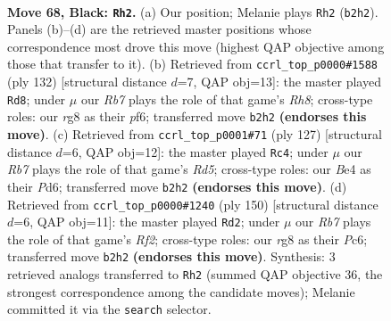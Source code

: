 \documentclass[11pt]{article}
\begin{document}
\clearpage

\begin{figure}[p]\centering
\begin{subfigure}{0.46\textwidth}\centering
\resizebox{\linewidth}{!}{%
\newchessgame
\chessboard[
  setfen={6R1/8/3k4/8/RP2b3/8/1r6/4K3 b - - 10 68},
  showmover=false,
  pgfstyle=straightmove, color=movearrow, markmove={b2-h2}
]}
\caption{}
\end{subfigure}\hfill
\begin{subfigure}{0.46\textwidth}\centering
\resizebox{\linewidth}{!}{%
\newchessgame
\chessboard[
  setfen={7R/8/5p2/r6p/5k2/7K/8/8 w - - 8 67},
  showmover=false,
  pgfstyle=straightmove, color=movearrow, markmove={h8-d8}
]}
\caption{}
\end{subfigure}
\\[4pt]
\begin{subfigure}{0.46\textwidth}\centering
\resizebox{\linewidth}{!}{%
\newchessgame
\chessboard[
  setfen={8/1k6/3p4/K2P3R/3r4/8/8/8 b - - 0 64},
  showmover=false,
  pgfstyle=straightmove, color=movearrow, markmove={d4-c4}
]}
\caption{}
\end{subfigure}\hfill
\begin{subfigure}{0.46\textwidth}\centering
\resizebox{\linewidth}{!}{%
\newchessgame
\chessboard[
  setfen={K7/4k3/2P5/8/8/1r3p2/5R2/8 w - - 4 76},
  showmover=false,
  pgfstyle=straightmove, color=movearrow, markmove={f2-d2}
]}
\caption{}
\end{subfigure}
\caption{\textbf{Move 68, Black: \texttt{Rh2}.} (a) Our position; Melanie plays \texttt{Rh2} (\texttt{b2h2}). Panels (b)--(d) are the retrieved master positions whose correspondence most drove this move (highest QAP objective among those that transfer to it). (b) Retrieved from \texttt{ccrl\_top\_p0000\#1588} (ply 132) [structural distance $d$=7, QAP obj=13]: the master played \texttt{Rd8}; under $\mu$ our \emph{Rb7} plays the role of that game's \emph{Rh8}; cross-type roles: our \emph{r}g8 as their \emph{p}f6; transferred move \texttt{b2h2} \textbf{(endorses this move)}. (c) Retrieved from \texttt{ccrl\_top\_p0001\#71} (ply 127) [structural distance $d$=6, QAP obj=12]: the master played \texttt{Rc4}; under $\mu$ our \emph{Rb7} plays the role of that game's \emph{Rd5}; cross-type roles: our \emph{B}e4 as their \emph{P}d6; transferred move \texttt{b2h2} \textbf{(endorses this move)}. (d) Retrieved from \texttt{ccrl\_top\_p0000\#1240} (ply 150) [structural distance $d$=6, QAP obj=11]: the master played \texttt{Rd2}; under $\mu$ our \emph{Rb7} plays the role of that game's \emph{Rf2}; cross-type roles: our \emph{r}g8 as their \emph{P}c6; transferred move \texttt{b2h2} \textbf{(endorses this move)}. Synthesis: 3 retrieved analogs transferred to \texttt{Rh2} (summed QAP objective 36, the strongest correspondence among the candidate moves); Melanie committed it via the \texttt{search} selector.}
\label{fig:thought-m135}
\end{figure}
\end{document}
